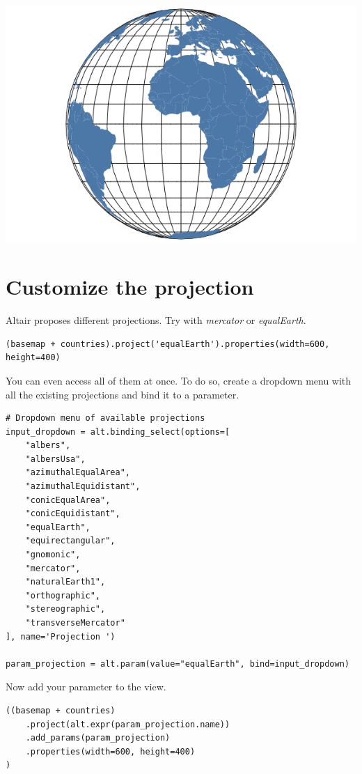 \documentclass[11pt]{article}
\begin{document}
\begin{center}
\includegraphics[width=.6\textwidth]{visualization (2).png}
\end{center}

\section{Customize the projection}

Altair proposes different projections. Try with \textit{mercator} or \textit{equalEarth}.

\begin{verbatim}
(basemap + countries).project('equalEarth').properties(width=600, height=400)
\end{verbatim}

You can even access all of them at once. To do so, create a dropdown menu with all the existing projections and bind it to a parameter.

\begin{verbatim}
# Dropdown menu of available projections
input_dropdown = alt.binding_select(options=[
    "albers",
    "albersUsa",
    "azimuthalEqualArea",
    "azimuthalEquidistant",
    "conicEqualArea",
    "conicEquidistant",
    "equalEarth",
    "equirectangular",
    "gnomonic",
    "mercator",
    "naturalEarth1",
    "orthographic",
    "stereographic",
    "transverseMercator"
], name='Projection ')

param_projection = alt.param(value="equalEarth", bind=input_dropdown)
\end{verbatim}

Now add your parameter to the view.

\begin{verbatim}
((basemap + countries)
    .project(alt.expr(param_projection.name))
    .add_params(param_projection)
    .properties(width=600, height=400)
)
\end{verbatim}
\end{document}
